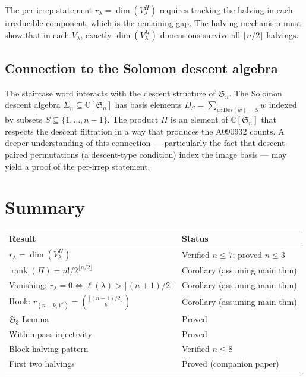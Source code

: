 \documentclass[11pt]{article}
\theoremstyle{definition}
\theoremstyle{remark}
\newcommand{\CC}{\mathbb{C}}
\newcommand{\Sym}{\mathfrak{S}}
\newcommand{\rk}{\operatorname{rank}}
\begin{document}
The per-irrep statement $r_\lambda = \dim(V_\lambda^H)$ requires
tracking the halving in each irreducible component, which is the
remaining gap. The halving mechanism must show that in each $V_\lambda$,
exactly $\dim(V_\lambda^H)$ dimensions survive all $\lfloor n/2\rfloor$
halvings.


\subsection{Connection to the Solomon descent algebra}

The staircase word interacts with the descent structure of $\Sym_n$.
The Solomon descent algebra $\Sigma_n \subseteq \CC[\Sym_n]$ has
basis elements $D_S = \sum_{w : \mathrm{Des}(w) = S} w$ indexed by
subsets $S \subseteq \{1, \ldots, n-1\}$. The product $\Pi$ is an
element of $\CC[\Sym_n]$ that respects the descent filtration in a
way that produces the A090932 counts. A deeper understanding of this
connection --- particularly the fact that descent-paired permutations
(a descent-type condition) index the image basis --- may yield a
proof of the per-irrep statement.


\section{Summary}

\begin{center}
\begin{tabular}{l|l}
\toprule
\textbf{Result} & \textbf{Status} \\
\midrule
$r_\lambda = \dim(V_\lambda^H)$ & Verified $n \le 7$; proved $n \le 3$ \\
$\rk(\Pi) = n!/2^{\lfloor n/2\rfloor}$ & Corollary (assuming main thm) \\
Vanishing: $r_\lambda = 0 \Leftrightarrow \ell(\lambda) > \lceil(n+1)/2\rceil$
  & Corollary (assuming main thm) \\
Hook: $r_{(n-k,1^k)} = \binom{\lfloor(n-1)/2\rfloor}{k}$
  & Corollary (assuming main thm) \\
$\Sym_3$ Lemma & Proved \\
Within-pass injectivity & Proved \\
Block halving pattern & Verified $n \le 8$ \\
First two halvings & Proved (companion paper) \\
\bottomrule
\end{tabular}
\end{center}
\end{document}
